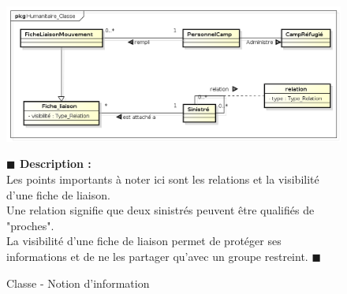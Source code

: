 \documentclass[11pt, titlepage]{report}
\newcommand{\debutDescription}{\noindent\textbf{\textcolor{DescriptionColor}{$\blacksquare$  Description : \\}}}
\newcommand{\finDescription}{\noindent\textcolor{DescriptionColor}{$\blacksquare$}}
\begin{document}
\begin{figure}[h!]
\begin{center}
\includegraphics[scale=.4]{../images/diagrammes/uml/exigence_1/classe_exigence_1.png} 
\caption{Classe - Notion d'information}
\end{center}
\debutDescription
Les points importants à noter ici sont les relations et la visibilité d'une fiche de liaison.\\
Une relation signifie que deux sinistrés peuvent être qualifiés de "proches". \\
La visibilité d'une fiche de liaison permet de protéger ses informations et de ne les partager qu'avec un groupe restreint.
\finDescription
\end{figure}
\end{document}
